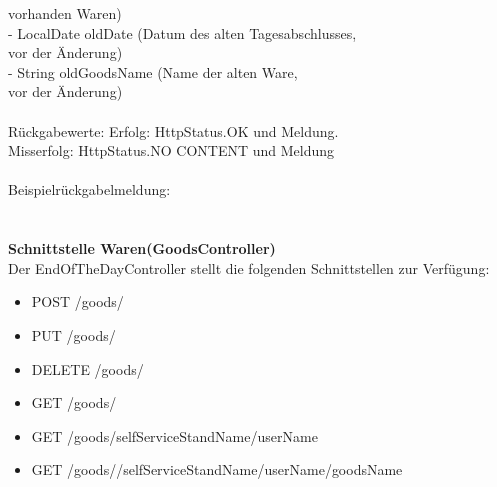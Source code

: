\tab\tab vorhanden Waren)\\
\tab\tab											- LocalDate oldDate (Datum des alten Tagesabschlusses, \\
\tab\tab vor der Änderung)\\
\tab\tab												- String oldGoodsName (Name der alten Ware, \\
\tab\tab vor der Änderung)\\
\\
Rückgabewerte: \tab 					Erfolg: HttpStatus.OK und Meldung.\\
\tab \tab 									Misserfolg: HttpStatus.NO CONTENT und Meldung\\
\\
Beispielrückgabelmeldung:	
\\
\\
\\

\textbf{Schnittstelle Waren(GoodsController)}
\\
Der EndOfTheDayController stellt die folgenden Schnittstellen zur Verfügung:

\begin{itemize}
	\itemsep0pt
	\item  POST /goods/
	\item  PUT /goods/
	\item  DELETE /goods/
	\item  GET /goods/
	\item  GET /goods/{selfServiceStandName}/{userName}	
	\item  GET /goods//{selfServiceStandName}/{userName}/{goodsName}
\end{itemize}

